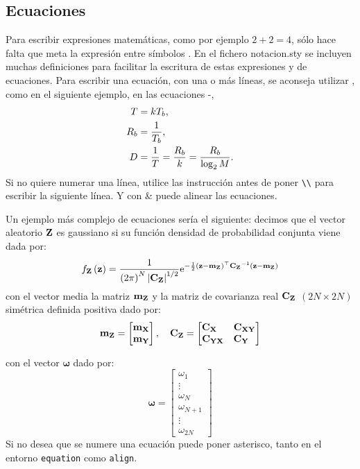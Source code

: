 \subsection{Ecuaciones}%
Para escribir expresiones matemáticas, como por ejemplo $2+2=4$, sólo hace falta que meta la expresión entre símbolos \ttcolor{\$}. En el fichero notacion.sty se incluyen muchas definiciones para facilitar la escritura de estas expresiones y de ecuaciones. Para escribir una ecuación, con una o más líneas, se aconseja utilizar , como en el siguiente ejemplo, en las ecuaciones -,
\begin{align}
 T     &=kT_b  \LABEQ{Eq1}, \\
 R_b&=\frac{1}{T_b }	, \\
 D    &=\frac{1}{T}=\frac{R_b }{k}=\frac{R_b}{\log_2 M}. \LABEQ{Eq3}
\end{align}
Si no quiere numerar una línea, utilice las instrucción  antes de poner \verb+\\+  para escribir la siguiente línea. Y con \& puede alinear las ecuaciones. 

Un ejemplo más complejo de ecuaciones sería el siguiente: decimos que el vector aleatorio $\mathbf{Z}$ es gaussiano si su función densidad de probabilidad conjunta viene dada por:
\begin{equation}\label{eq02-x131}
f_{\mathbf{Z}}\left( {\mathbf{z}} \right)= \frac{1}{\left( {2\pi} \right)^{N}{\left| {\mathbf{C_{Z}}} \right|}^{1/2}}\mathrm{e}^{-\frac{1}{2}\left( {\mathbf{z}-\mathbf{m_{Z}}} \right)^\top\mathbf{C_{Z}}^{-1}\left( {\mathbf{z}-\mathbf{m_{Z}}} \right) }
\end{equation}
con el vector media la matriz $\mathbf{m_{Z}}$ y la matriz de covarianza real $\mathbf{C_{Z}}$ $\left( {2N \times 2N} \right)$ simétrica definida positiva dado por:
\begin{equation}\label{eq02-x132}
\mathbf{m_{Z}}=\begin{bmatrix}
\mathbf{m_{X}}\\
\mathbf{m_{Y}}
\end{bmatrix}, \quad
\mathbf{C_{Z}}=\begin{bmatrix}
\mathbf{C_{X\hphantom{X}}} & \mathbf{C}_{\mathbf{XY}}\\
\mathbf{C_{YX}} & \mathbf{C_{Y\hphantom{X}}}
\end{bmatrix}
\end{equation}

con el vector $\bm{\omega}$ dado por:
\begin{equation}\label{eq02-y410}
\bm{\omega}=\begin{bmatrix}
\omega_{1}\\
\vdots \\
\omega_{N}\\
\omega_{N+1}\\
\vdots \\
\omega_{2N}
\end{bmatrix}
\end{equation}
Si no desea que se numere una ecuación puede poner asterisco, tanto en el entorno \verb+equation+ como \verb+align+.



